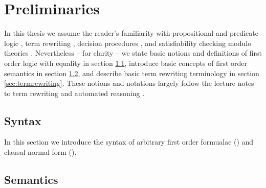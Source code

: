 
\chapter{Preliminaries}

%

In this thesis we assume the reader's familiarity with
propositional and predicate logic \cite{Huth:2004:LCS:975331},
term rewriting \cite{Baader:1998:TR:280474},
decision procedures \cite{Kroening:2008:DPA:1391237},
and satisfiability checking modulo theories \cite{Biere:2009:HSV:1550723}.
Nevertheless -- for clarity -- we state basic notions and  definitions
of first order logic with equality in section \ref{sec:syntax},
introduce basic concepts of first order semantics in section \ref{sec:semantics},
and describe basic term rewriting terminology in section \ref{sec:termrewriting}.
These notions and notations largely follow the lecture notes to term rewriting and automated reasoning \cite{AM2015tr, GM2013ar}.


\section{Syntax}\label{sec:syntax}

In this section we introduce the syntax of arbitrary first order formualae (\FOF)
and clausal normal form (\CNF).

























\section{Semantics}\label{sec:semantics}

